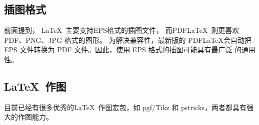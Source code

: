 \subsection{插图格式}

前面提到， \LaTeX\ 主要支持EPS格式的插图文件， 而PDF\LaTeX\ 则更喜欢 PDF、PNG、JPG 格式的图形。
为解决兼容性，最新版的 PDF\LaTeX 会自动把 EPS 文件转换为 PDF 文件。因此，使用 EPS 格式的插图可能具有最广泛
的通用性。

\subsection{\LaTeX\ 作图}

目前已经有很多优秀的\LaTeX\ 作图宏包，如 pgf/Tikz 和 pstricks，两者都具有强大的作图能力。
